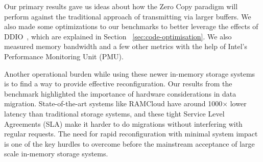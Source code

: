 Our primary results gave us ideas about how the Zero Copy paradigm will perform against
the traditional approach of transmitting via larger buffers. We also made some optimizations to our 
benchmarks to better leverage the effects of DDIO~\cite{ddio}, which are explained in Section ~\ref{sec:code-optimisation}. 
We also measured memory bandwidth and a few other metrics with the help of Intel\textregistered's Performance Monitoring Unit (PMU).

Another operational burden while using these newer in-memory storage systems is to find a way to 
provide effective reconfiguration. Our results from the benchmark \linebreak highlighted the importance of 
hardware considerations in data migration. State-of-the-art systems like RAMCloud have around 1000$\times$
lower latency than traditional storage systems, and these tight Service Level Agreements (SLA) make it harder to do migrations
without interfering with regular requests. The need for rapid reconfiguration with minimal system 
impact is one of the key hurdles to overcome before the mainstream acceptance of large scale 
in-memory storage systems.

